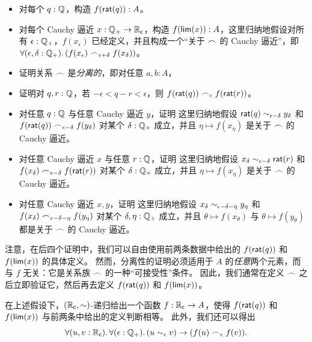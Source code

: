 \begin{itemize}
\item 对每个 $q : \mathbb{Q}$，构造 $f(\mathsf{rat}(q)) : A$。
\item 对每个 Cauchy 逼近 $x : \mathbb{Q}_{+} \to \mathbb{R}_\mathsf{c}$，构造 $f(\mathsf{lim}(x)) : A$，这里归纳地假设对所有 $\epsilon : \mathbb{Q}_{+}$，$f(x_\epsilon)$ 已经定义，并且构成一个``关于 $\frown$ 的 Cauchy 逼近''，即 $\fall{\epsilon,\delta:\Qp} (f(x_\epsilon) \bsim_{\epsilon+\delta} f(x_\delta))$。
\item 证明关系 $\frown$ 是\emph{分离的}，即对任意 $a,b:A$，
\item 证明对 $q,r:\mathbb{Q}$，若 $-\epsilon< q-r <\epsilon$，则 $f(\mathsf{rat}(q))\frown_\epsilon f(\mathsf{rat}(r))$。
\item 对任意 $q:\mathbb{Q}$ 与任意 Cauchy 逼近 $y$，证明
 这里归纳地假设 $\mathsf{rat}(q)\sim_{\epsilon-\delta} y_\delta$ 和 $f(\mathsf{rat}(q)) \frown_{\epsilon-\delta} f(y_\delta)$ 对某个 $\delta:\mathbb{Q}_{+}$ 成立，并且 $\eta \mapsto f(x_\eta)$ 是关于 $\frown$ 的 Cauchy 逼近。
\item 对任意 Cauchy 逼近 $x$ 与任意 $r:\mathbb{Q}$，证明
这里归纳地假设 $x_\delta \sim_{\epsilon-\delta} \mathsf{rat}(r)$ 和 $f(x_\delta) \frown_{\epsilon-\delta} f(\mathsf{rat}(r))$ 对某个 $\delta:\mathbb{Q}_{+}$ 成立，并且 $\eta\mapsto f(x_\eta)$ 是关于 $\frown$ 的 Cauchy 逼近。
\item 对任意 Cauchy 逼近 $x,y$，证明
这里归纳地假设 $x_\delta \sim_{\epsilon-\delta-\eta} y_\eta$ 和 $f(x_\delta) \frown_{\epsilon-\delta-\eta} f(y_\eta)$ 对某个 $\delta,\eta:\mathbb{Q}_{+}$ 成立，并且 $\theta\mapsto f(x_\theta)$ 与 $\theta\mapsto f(y_\theta)$ 都是关于 $\frown$ 的 Cauchy 逼近。
\end{itemize}


注意，在后四个证明中，我们可以自由使用前两条数据中给出的 $f(\mathsf{rat}(q))$ 和 $f(\mathsf{lim}(x))$ 的具体定义。
然而，分离性的证明必须适用于 $A$ 的\emph{任意}两个元素，而与 $f$ 无关：它是关系族 $\frown$ 的一种``可接受性''条件。
因此，我们通常在定义 $\frown$ 之后立即验证它，然后再去定义 $f(\mathsf{rat}(q))$ 和 $f(\mathsf{lim}(x))$。

在上述假设下，$(\mathbb{R}_\mathsf{c},\mathord\sim)$-递归给出一个函数 $f:\mathbb{R}_\mathsf{c}\to A$，使得 $f(\mathsf{rat}(q))$ 和 $f(\mathsf{lim}(x))$ 与前两条中给出的定义判断相等。
此外，我们还可以得出
\begin{equation}
  \fall{u,v:\RC}{\epsilon:\Qp} (u\close\epsilon v) \to (f(u) \bsim_\epsilon f(v)).\label{eq:RC-sim-recursion-extra}
\end{equation}

